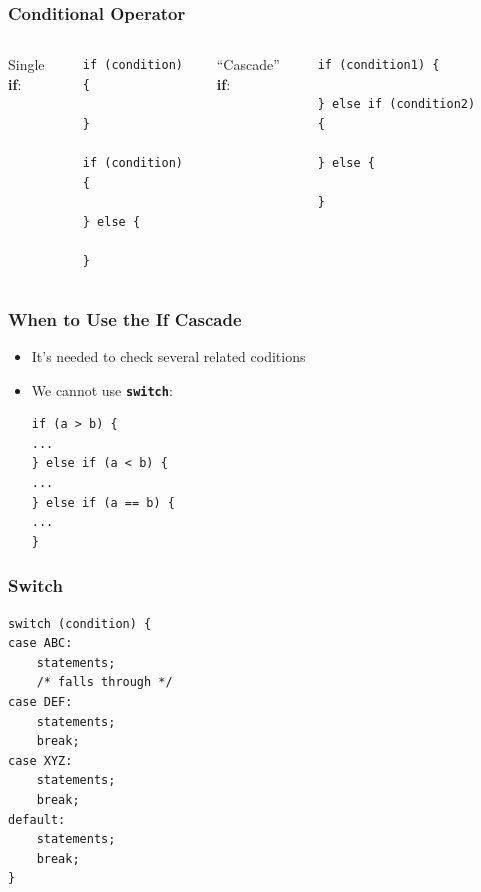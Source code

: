 \documentclass[screen]{beamer}
\begin{document}
\begin{frame}[fragile]
\frametitle{Conditional Operator}%
%
\begin{columns}
Single \textbf{if}:
\begin{lstlisting}
if (condition) {

}

if (condition) {

} else {

}
\end{lstlisting}
``Cascade'' \textbf{if}:
\begin{lstlisting}
if (condition1) {

} else if (condition2) {

} else {

}
\end{lstlisting}
$\;$\\
$\;$\\
\end{columns}
\end{frame}

\begin{frame}[fragile]
\frametitle{When to Use the If Cascade}%
%
\begin{itemize}[<+->]
	\item It's needed to check several \alert{related} coditions
	\item We cannot use {\bf \texttt{switch}}: 
\begin{lstlisting}
if (a > b) {
...
} else if (a < b) {
...
} else if (a == b) {
...
}
\end{lstlisting}
\end{itemize}
\end{frame}

\begin{frame}[fragile]
\frametitle{Switch}%
%
\begin{lstlisting}
switch (condition) {
case ABC:
    statements;
    /* falls through */
case DEF:
    statements;
    break;
case XYZ:
    statements;
    break;
default:
    statements;
    break;
}
\end{lstlisting}
\end{frame}
\end{document}
